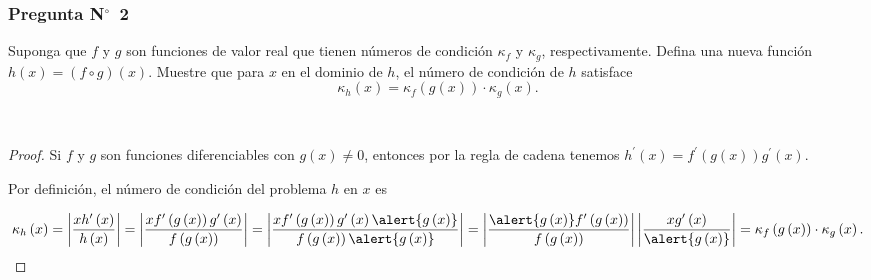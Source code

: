 \documentclass[
	spanish,
	8pt,
	utf8,
	xcolor=table,
	handout,
	aspectratio=169,
	professionalfonts,
	mathserif,
	leqno,
]{beamer}
\begin{document}
\begin{frame}
	\frametitle{Pregunta N$^{\circ}$~2}

	Suponga que $f$ y $g$ son funciones de valor real que
	tienen números de condición $\kappa_{f}$ y $\kappa_{g}$,
	respectivamente.
	Defina una nueva función
	\begin{math}
		h\left(x\right)=
		\left(f\circ g\right)
		\left(x\right)
	\end{math}.
	Muestre que para $x$ en el dominio de $h$, el número de
	condición de $h$ satisface
	\begin{equation*}
		\boxed{
			\kappa_{h}\left(x\right)=
			\kappa_{f}\left(g\left(x\right)\right)\cdot
			\kappa_{g}\left(x\right).
		}
	\end{equation*}

	\

	\begin{proof}

		Si $f$ y $g$ son funciones diferenciables con
		$g\left(x\right)\neq0$, entonces por la regla de cadena tenemos
		\begin{math}
			h^{\prime}
			\left(x\right)=
			f^{\prime}
			\left(g\left(x\right)\right)
			g^{\prime}\left(x\right).
		\end{math}

		Por definición, el número de condición del problema $h$ en
		$x$ es

		\begin{equation*}
			\kappa_{h}
			\left(x\right)=
			\left|
			\frac{
				xh^{\prime}
				\left(
				x
				\right)
			}{
				h
				\left(
				x
				\right)
			}
			\right|=
			\left|
			\frac{
				xf^{\prime}
				\left(
				g\left(x\right)
				\right)
				g^{\prime}
				\left(
				x
				\right)
			}{
				f\left(
				g\left(x\right)
				\right)
			}
			\right|=
			\left|
			\frac{
				xf^{\prime}
				\left(
				g\left(x\right)
				\right)
				g^{\prime}
				\left(x\right)
				\alert{g\left(x\right)}
			}{
				f\left(g\left(x\right)\right)
				\alert{g\left(x\right)}
			}
			\right|=
			\left|
			\frac{
				\alert{g\left(x\right)}
				f^{\prime}
				\left(g\left(x\right)\right)
			}{
				f\left(
				g\left(x\right)
				\right)
			}
			\right|
			\left|
			\frac{
				xg^{\prime}\left(x\right)
			}{
				\alert{g\left(x\right)}
			}
			\right|=
			\kappa_{f}\left(g\left(x\right)\right)\cdot
			\kappa_{g}\left(x\right)
			.
		\end{equation*}


\end{proof}
\end{frame}
\end{document}
